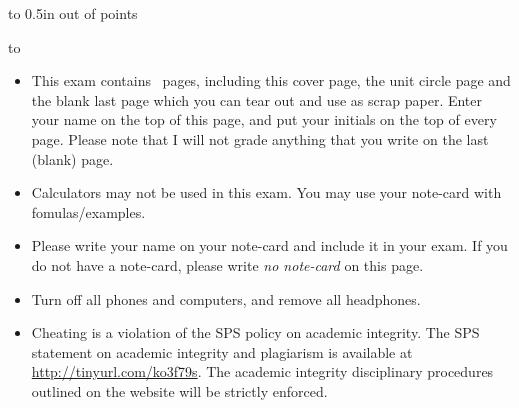 \documentclass[11pt,answers]{exam}
\begin{document}
\extrawidth{-0.3in}
\pagestyle{headandfoot}

\setlength{\hoffset}{-.25in}

\extraheadheight{-.4in}
{} 



\firstpagefooter{\bfseries{}}{}{} 


\runningheader{\bfseries {}}%
              {\bfseries {}}%
              { 
							}
\runningfooter{} %
                {}
                { \hbox to 0.5in{\hrulefill}
                 out of  \pointsonpage{\thepage} points}
                 
						

\vspace*{0.2cm}
\hbox to 
\vspace{0.2in}

\begin{itemize}
	\item This exam contains \numpages\ pages, including this cover page, the unit circle page and the blank last page which you can tear out and use as scrap paper. Enter
your name on the top of this page, and put your initials
on the top of every page. Please note that I will not grade anything that you write on the last (blank) page.

\item Calculators may not be used in this exam. You may use your note-card with fomulas/examples. 

\item Please write your name on your note-card and include it in your exam. If you do not have a note-card, please write {\textit {no note-card}} on this page.
\item Turn off all phones and computers, and remove all headphones.
\item Cheating is a violation of the SPS policy on academic integrity. The SPS statement on academic integrity and
plagiarism is available at \url{http://tinyurl.com/ko3f79s}. The academic integrity disciplinary procedures outlined on the
website will be strictly enforced.

\end{itemize}
\end{document}
